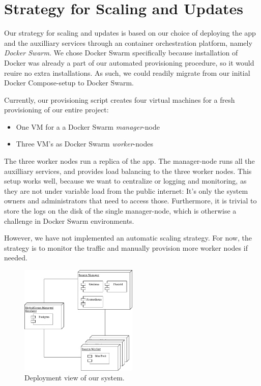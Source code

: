 \section{Strategy for Scaling and Updates}

Our strategy for scaling and updates is based on our choice of deploying the app and the auxilliary services through an container orchestration platform, namely \textit{Docker Swarm}. We chose Docker Swarm specifically because installation of Docker was already a part of our automated provisioning procedure, so it would reuire no extra installations.
As such, we could readily migrate from our initial Docker Compose-setup to Docker Swarm.

Currently, our provisioning script creates four virtual machines for a fresh provisioning of our entire project:

\begin{itemize}
	\item One VM for a a Docker Swarm \textit{manager}-node
	\item Three VM's as Docker Swarm \textit{worker}-nodes
\end{itemize}

The three worker nodes run a replica of the app.
The manager-node runs all the auxilliary services, and provides load balancing to the three worker nodes.
This setup works well, because we want to centralize or logging and monitoring, as they are not under variable load from the public internet: It's only the system owners and administrators that need to access those.
Furthermore, it is trivial to store the logs on the disk of the single manager-node, which is otherwise a challenge in Docker Swarm environments.

However, we have not implemented an automatic scaling strategy. For now, the strategy is to monitor the traffic and manually provision more worker nodes if needed.

\begin{figure}
	\begin{center}
		\includegraphics[width=0.50\textwidth]{img/deployment.pdf}
	\end{center}
	\caption{Deployment view of our system.}\label{fig:deployment}
\end{figure}

